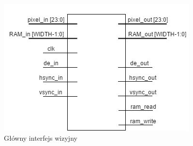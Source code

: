 		\begin{figure}[h!]
				\centering
				\includegraphics[scale=0.75]{img/4/vision_if.png}
				\caption{Główny interfejs wizyjny}
				\label{fig:fpga_vision_if}
		\end{figure}

